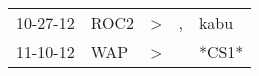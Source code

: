 \begin{supertabular}{p{0.07\textwidth}p{0.06\textwidth}p{0.02\textwidth}p{0.02\textwidth}p{0.06\textwidth}}
 10-27-12\textsuperscript{} &  ROC2\textsuperscript{} &  \textgreater &  , &  kabu\textsuperscript{} \\
 11-10-12\textsuperscript{} &   WAP\textsuperscript{} &  \textgreater &    &                   *CS1* \\
\end{supertabular}

